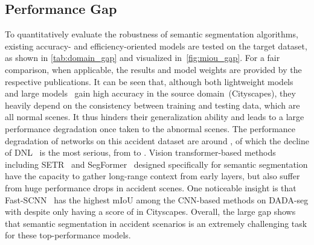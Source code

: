 \documentclass[journal]{IEEEtran}
\begin{document}
\subsection{Performance Gap}\label{exp:performance_gap}
To quantitatively evaluate the robustness of semantic segmentation algorithms, existing accuracy- and efficiency-oriented models are tested on the target dataset, as shown in \cref{tab:domain_gap} and visualized in~\cref{fig:miou_gap}. For a fair comparison, when applicable, the results and model weights are provided by the respective publications. It can be seen that, although both lightweight models~\cite{romera2017erfnet}\cite{orsic2019swiftnet}\cite{poudel2019fastscnn}\cite{Howard_2019MobileNetV3} and large models~\cite{zhao2017PSPNet}\cite{chen2018deeplabv3plus}\cite{yuan2019OCRNet}\cite{fu2019dual}\cite{yin2020dnl}\cite{zhang2020resnest}\cite{Kirillov2019PanopticFPN} gain high accuracy in the source domain~(Cityscapes), they heavily depend on the consistency between training and testing data, which are all normal scenes. It thus hinders their generalization ability and leads to a large performance degradation once taken to the abnormal scenes. The performance degradation of networks on this accident dataset are around , of which the  decline of DNL~\cite{yin2020dnl} is the most serious, from  to . {Vision transformer-based methods including SETR~\cite{setr} and SegFormer~\cite{segformer} designed specifically for semantic segmentation have the capacity to gather long-range context from early layers, but also suffer from huge performance drops in accident scenes.} One noticeable insight is that Fast-SCNN~\cite{poudel2019fastscnn} has the highest mIoU {among the CNN-based methods} on DADA-seg with  despite only having a score of  in Cityscapes. Overall, the large gap shows that semantic segmentation in accident scenarios is an extremely challenging task for these top-performance models.
\end{document}
